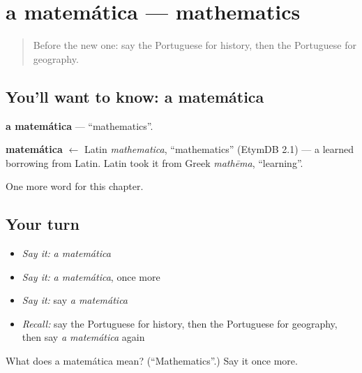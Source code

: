 \section[a matemática]{a matemática — mathematics}

\label{lesson:PT-C230-matematica}



\begin{quote}
Before the new one: say the Portuguese for history, then the Portuguese for geography.
\end{quote}

\subsection*{You'll want to know: a matemática}
\textbf{a matemática} — \textquotedblleft{}mathematics\textquotedblright{}.

\begin{cousinweb}
\textbf{matemática} $\leftarrow$ Latin \emph{mathematica}, \textquotedblleft{}mathematics\textquotedblright{} (EtymDB 2.1) — a learned borrowing from Latin. Latin took it from Greek \emph{mathēma}, \textquotedblleft{}learning\textquotedblright{}.
\end{cousinweb}

\begin{grammarlens}[title={What you've built}]
One more word for this chapter.
\end{grammarlens}

\subsection*{Your turn}
\begin{itemize}
\raggedright
  \item \emph{Say it:} \emph{a matemática}
  \item \emph{Say it:} \emph{a matemática}, once more
  \item \emph{Say it:} say \emph{a matemática}
  \item \emph{Recall:} say the Portuguese for history, then the Portuguese for geography, then say \emph{a matemática} again
\end{itemize}

\begin{tcolorbox}[breakable,colback=teal!4,colframe=teal!35!black,title={Before you move on}]
What does a matemática mean? (\textquotedblleft{}Mathematics\textquotedblright{}.) Say it once more.
\end{tcolorbox}

